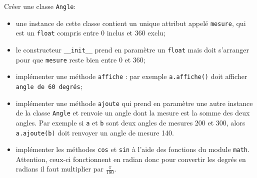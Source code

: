 \documentclass[a4paper,10pt,cours,firamath]{nsi}
\begin{document}
\begin{exercice}[ : angles]
    Créer une classe \texttt{Angle}:
    \begin{itemize}
        \item     une instance de cette classe contient un unique attribut appelé \texttt{mesure}, qui est un \texttt{float} compris entre 0 inclus et 360 exclu;
        \item     le constructeur \texttt{__init__} prend en paramètre un \texttt{float} mais doit s'arranger pour que \texttt{mesure} reste bien entre 0 et 360;
        \item     implémenter une méthode \texttt{affiche} : par exemple \texttt{a.affiche()} doit afficher \texttt{angle de 60 degrés};
        \item    implémenter une méthode \texttt{ajoute} qui prend en paramètre une autre instance de la classe \texttt{Angle} et renvoie un angle dont la mesure est la somme des deux angles. Par exemple si \texttt{a} et \texttt{b} sont deux angles de mesures 200 et 300, alors \texttt{a.ajoute(b)} doit renvoyer un angle de mesure 140.
        \item     implémenter les méthodes \texttt{cos} et \texttt{sin} à l'aide des fonctions du module \texttt{math}. Attention, ceux-ci fonctionnent en radian donc pour convertir les degrés en radians il faut multiplier par $\frac{\pi}{180}$.
    \end{itemize}
\end{exercice}
\end{document}
